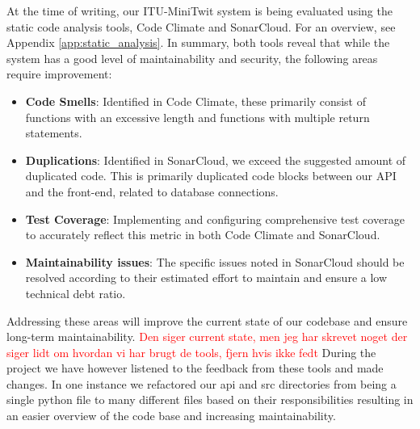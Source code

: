 At the time of writing, our ITU-MiniTwit system is being evaluated using the static code analysis tools, Code Climate and SonarCloud.
For an overview, see Appendix \ref{app:static_analysis}. In summary, both tools reveal that while the system has a good level of maintainability and security, the following areas require improvement:

\begin{itemize}
    \item \textbf{Code Smells}: Identified in Code Climate, these primarily consist of functions with an excessive length and functions with multiple return statements. 
    \item \textbf{Duplications}: Identified in SonarCloud, we exceed the suggested amount of duplicated code. This is primarily duplicated code blocks between our API and the front-end, related to database connections.  
    \item \textbf{Test Coverage}: Implementing and configuring comprehensive test coverage to accurately reflect this metric in both Code Climate and SonarCloud.
    \item \textbf{Maintainability issues}: The specific issues noted in SonarCloud should be resolved according to their estimated effort to maintain and ensure a low technical debt ratio.
\end{itemize}

Addressing these areas will improve the current state of our codebase and ensure long-term maintainability. 
\textcolor{red}{Den siger current state, men jeg har skrevet noget der siger lidt om hvordan vi har brugt de tools, fjern hvis ikke fedt}
During the project we have however listened to the feedback from these tools and made changes. 
In one instance we refactored our api and src directories from being a single python file to many different files based on their responsibilities resulting in an easier overview of the code base and increasing maintainability.
